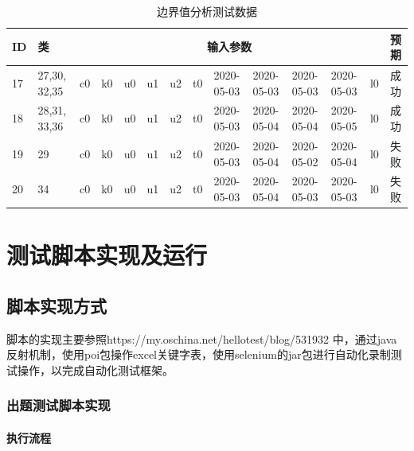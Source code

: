 \documentclass[hyperref, a4paper]{ctexart}
\let\oldparagraph\paragraph
\renewcommand{\paragraph}[1]{\oldparagraph{#1}\mbox{}}
\begin{document}
\begin{table}[!htbp]
  \caption{边界值分析测试数据}
  \centering
  \begin{tabular}{|p{0.35cm}|p{1.2cm}|p{0.22cm}|p{0.22cm}|p{0.22cm}|p{0.22cm}|p{0.22cm}|p{0.22cm}|p{0.9cm}|p{0.9cm}|p{0.9cm}|p{0.9cm}|p{0.22cm}|p{0.8cm}|}
  \hline
  \textbf{ID} & \textbf{类} & \multicolumn{11}{c|}{\textbf{输入参数}} & \textbf{预期}  \\ 
  \hline
17   & 27,30, 32,35 & c0  & k0  & u0 & u1 & u2 & t0  & 2020-05-03 & 2020-05-03 & 2020-05-03 & 2020-05-03 & l0 & 成功   \\
  \hline
18   & 28,31, 33,36 & c0  & k0  & u0 & u1 & u2 & t0  & 2020-05-03 & 2020-05-04 & 2020-05-04 & 2020-05-05 & l0 & 成功   \\
  \hline
19   & 29           & c0  & k0  & u0 & u1 & u2 & t0  & 2020-05-03 & 2020-05-04 & 2020-05-02 & 2020-05-04 & l0 & 失败   \\
  \hline
20   & 34           & c0  & k0  & u0 & u1 & u2 & t0  & 2020-05-03 & 2020-05-04 & 2020-05-03 & 2020-05-03 & l0 & 失败   \\
  \hline
  \end{tabular}
\end{table}

\pagebreak

\hypertarget{ux6d4bux8bd5ux811aux672cux5b9eux73b0ux53caux8fd0ux884c}{%
\section{测试脚本实现及运行}\label{ux6d4bux8bd5ux811aux672cux5b9eux73b0ux53caux8fd0ux884c}}

\hypertarget{ux811aux672cux5b9eux73b0ux65b9ux5f0f}{%
\subsection{脚本实现方式}\label{ux811aux672cux5b9eux73b0ux65b9ux5f0f}}

脚本的实现主要参照https://my.oschina.net/hellotest/blog/531932
中，通过java反射机制，使用poi包操作excel关键字表，使用selenium的jar包进行自动化录制测试操作，以完成自动化测试框架。

\hypertarget{ux51faux9898ux6d4bux8bd5ux811aux672cux5b9eux73b0}{%
\subsubsection{出题测试脚本实现}\label{ux51faux9898ux6d4bux8bd5ux811aux672cux5b9eux73b0}}

\hypertarget{ux6267ux884cux6d41ux7a0b}{%
\paragraph{执行流程}\label{ux6267ux884cux6d41ux7a0b}}
\end{document}
